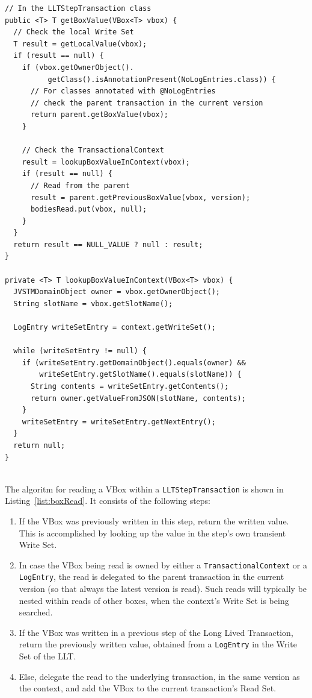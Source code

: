 \begin{lstlisting}[caption={Reading a VBox within a
    LLTStepTransaction}, label={list:boxRead}, float]
// In the LLTStepTransaction class
public <T> T getBoxValue(VBox<T> vbox) {
  // Check the local Write Set
  T result = getLocalValue(vbox);
  if (result == null) {
    if (vbox.getOwnerObject().
          getClass().isAnnotationPresent(NoLogEntries.class)) {
      // For classes annotated with @NoLogEntries
      // check the parent transaction in the current version
      return parent.getBoxValue(vbox);
    }

    // Check the TransactionalContext
    result = lookupBoxValueInContext(vbox);
    if (result == null) {
      // Read from the parent
      result = parent.getPreviousBoxValue(vbox, version);
      bodiesRead.put(vbox, null);
    }
  }
  return result == NULL_VALUE ? null : result;
}

private <T> T lookupBoxValueInContext(VBox<T> vbox) {
  JVSTMDomainObject owner = vbox.getOwnerObject();
  String slotName = vbox.getSlotName();

  LogEntry writeSetEntry = context.getWriteSet();

  while (writeSetEntry != null) {
    if (writeSetEntry.getDomainObject().equals(owner) &&
        writeSetEntry.getSlotName().equals(slotName)) {
      String contents = writeSetEntry.getContents();
      return owner.getValueFromJSON(slotName, contents);
    }
    writeSetEntry = writeSetEntry.getNextEntry();
  }
  return null;
}


\end{lstlisting}

The algoritm for reading a VBox within a \texttt{LLTStepTransaction} is shown in
Listing~\ref{list:boxRead}. It consists of the following steps:

\begin{enumerate}

\item If the VBox was previously written in this step, return the
  written value. This is accomplished by looking up the value in the
  step's own transient Write Set.

\item In case the VBox being read is owned by either a
  \texttt{TransactionalContext} or a \texttt{LogEntry}, the read is
  delegated to the parent transaction in the current version (so that
  always the latest version is read). Such reads will typically be
  nested within reads of other boxes, when the context's Write Set is
  being searched.

\item If the VBox was written in a previous step of the Long Lived
  Transaction, return the previously written value, obtained from a
  \texttt{LogEntry} in the Write Set of the LLT.

\item Else, delegate the read to the underlying transaction, in the
  same version as the context, and add the VBox to the current
  transaction's Read Set.

\end{enumerate}

